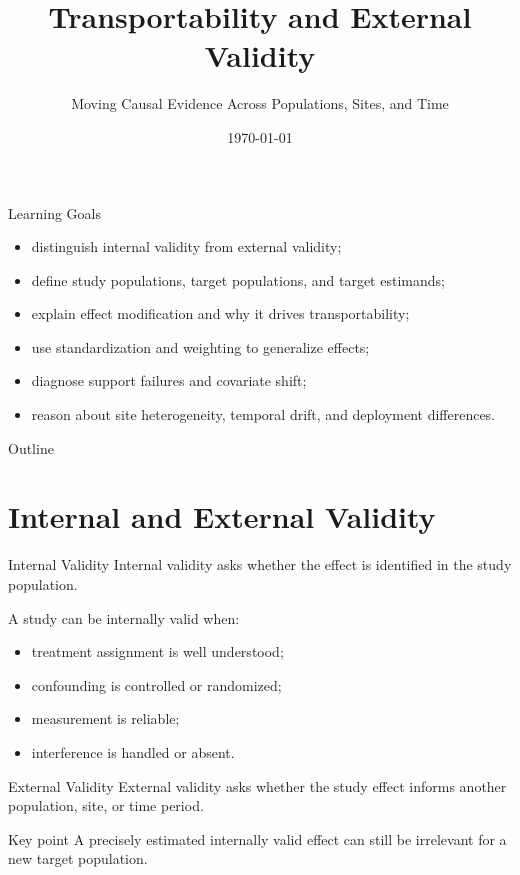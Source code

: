 \documentclass[aspectratio=169,11pt]{beamer}
\title[Transportability]{Transportability and External Validity}
\subtitle{Moving Causal Evidence Across Populations, Sites, and Time}
\date{\today}
\begin{document}
\begin{frame}
\titlepage
\end{frame}

\begin{frame}{Learning Goals}
\begin{itemize}
\item distinguish internal validity from external validity;
\item define study populations, target populations, and target estimands;
\item explain effect modification and why it drives transportability;
\item use standardization and weighting to generalize effects;
\item diagnose support failures and covariate shift;
\item reason about site heterogeneity, temporal drift, and deployment differences.
\end{itemize}
\end{frame}

\begin{frame}{Outline}
\tableofcontents
\end{frame}

\section{Internal and External Validity}

\begin{frame}{Internal Validity}
Internal validity asks whether the effect is identified in the study population.

A study can be internally valid when:
\begin{itemize}
\item treatment assignment is well understood;
\item confounding is controlled or randomized;
\item measurement is reliable;
\item interference is handled or absent.
\end{itemize}
\end{frame}

\begin{frame}{External Validity}
External validity asks whether the study effect informs another population, site, or time period.

\begin{alertblock}{Key point}
A precisely estimated internally valid effect can still be irrelevant for a new target population.
\end{alertblock}
\end{frame}
\end{document}
